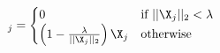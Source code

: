 \documentclass[preview,border=0.3pt]{standalone}
\begin{document}
%
\begin{equation*}
[\mathrm{prox}_{g}(\X)]_j = 
    \begin{cases}
        0&\text{if}\ ||\X_j||_2 < \lambda\\
        \left(1-\frac{\lambda}{||\X_j||_2}\right)\X_j&\text{otherwise}\\
    \end{cases}
\end{equation*}
\end{document}
